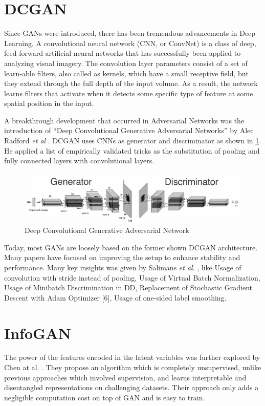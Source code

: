 \section{DCGAN} %
\label{sec:dcgan}
Since GANs were introduced, there has been tremendous advancements in Deep Learning. A convolutional neural network (CNN, or ConvNet) \cite{imagenet} is a class of deep, feed-forward artificial neural networks that has successfully been applied to analyzing visual imagery. The convolution layer parameters consist of a set of learn-able filters, also called as kernels, which have a small receptive field, but they extend through the full depth of the input volume. As a result, the network learns filters that activate when it detects some specific type of feature at some spatial position in the input.
\par\bigskip
A breakthrough development that occurred in Adversarial Networks was the introduction of “Deep Convolutional Generative Adversarial Networks” by Alec Radford \textit{et al} \cite{dcgan}. DCGAN uses CNNs as generator and discriminator as shown in \ref{fig:dcgan}. He applied a list of empirically validated tricks as the substitution of pooling and fully connected layers with convolutional layers.
\par\bigskip
\begin{figure}[H]
\centering\includegraphics[width=1\textwidth]{images/dcgan.png}
\caption{Deep Convolutional Generative Adversarial Network}
\label{fig:dcgan}
\end{figure}
Today, most GANs are loosely based on the former shown DCGAN \cite{dcgan} architecture. Many papers have focused on improving the setup to enhance stability and performance. Many key insights was given by Salimans \textit{et al}. \cite{improvedgan}, like Usage of convolution with stride instead of pooling, Usage of Virtual Batch Normalization, Usage of Minibatch Discrimination in DD, Replacement of Stochastic Gradient Descent with Adam Optimizer [6], Usage of one-sided label smoothing.
\par\bigskip
\section{InfoGAN} %
\label{sec:infogan}
The power of the features encoded in the latent variables was further explored by Chen at al. \cite{infogan}. They propose an algorithm which is completely unsupervised, unlike previous approaches which involved supervision, and learns interpretable and disentangled representations on challenging datasets. Their approach only adds a negligible computation cost on top of GAN and is easy to train.
\par\bigskip

